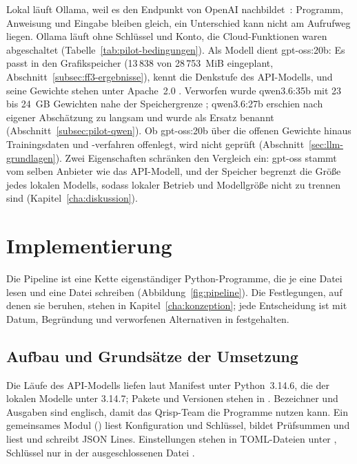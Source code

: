 \documentclass[11pt,a4paper]{report}
\begin{document}
Lokal läuft Ollama, weil es den Endpunkt  von OpenAI
nachbildet~\cite[Abschn.~Responses API]{ollamaopenai}: Programm,
Anweisung und Eingabe bleiben gleich, ein Unterschied kann nicht am
Aufrufweg liegen. Ollama läuft ohne Schlüssel und Konto, die
Cloud-Funktionen waren abgeschaltet
(Tabelle~\ref{tab:pilot-bedingungen}). Als Modell dient gpt-oss:20b: Es
passt in den Grafikspeicher (13\,838 von 28\,753~MiB eingeplant,
Abschnitt~\ref{subsec:ff3-ergebnisse}), kennt die Denkstufe des
API-Modells, und seine Gewichte stehen unter Apache~2.0
\cite{ollamagptoss}. Verworfen wurde qwen3.6:35b mit 23 bis 24~GB
Gewichten nahe der Speichergrenze \cite{ollamaqwen36}; qwen3.6:27b
erschien nach eigener Abschätzung zu langsam und wurde als Ersatz
benannt (Abschnitt~\ref{subsec:pilot-qwen}). Ob gpt-oss:20b über die
offenen Gewichte hinaus Trainingsdaten und -verfahren offenlegt, wird
nicht geprüft (Abschnitt~\ref{sec:llm-grundlagen}). Zwei Eigenschaften
schränken den Vergleich ein: gpt-oss stammt vom selben Anbieter wie das
API-Modell, und der Speicher begrenzt die Größe jedes lokalen Modells,
sodass lokaler Betrieb und Modellgröße nicht zu trennen sind
(Kapitel~\ref{cha:diskussion}).


\chapter{Implementierung}
\label{cha:implementierung}

Die Pipeline ist eine Kette eigenständiger Python-Programme, die je eine
Datei lesen und eine Datei schreiben (Abbildung~\ref{fig:pipeline}).
Die Festlegungen, auf denen sie beruhen, stehen in
Kapitel~\ref{cha:konzeption}; jede Entscheidung ist mit Datum,
Begründung und verworfenen Alternativen in 
festgehalten.

\section{Aufbau und Grundsätze der Umsetzung}
\label{sec:impl-grundsaetze}

Die Läufe des API-Modells liefen laut Manifest unter Python~3.14.6, die
der lokalen Modelle unter 3.14.7; Pakete und Versionen stehen in
. Bezeichner und Ausgaben sind englisch, damit
das Qrisp-Team die Programme nutzen kann. Ein gemeinsames Modul
() liest Konfiguration und Schlüssel,
bildet Prüfsummen und liest und schreibt JSON Lines. Einstellungen
stehen in TOML-Dateien unter , Schlüssel nur in der
ausgeschlossenen Datei .
\end{document}

